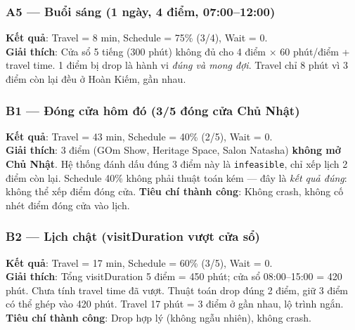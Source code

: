 \documentclass[12pt,a4paper]{article}
\begin{document}
\subsubsection*{A5 --- Buổi sáng (1 ngày, 4 điểm, 07:00--12:00)}
\begin{tcolorbox}[scenbox]
\textbf{Kết quả}: Travel = 8 min, Schedule = 75\% (3/4), Wait = 0.\\
\textbf{Giải thích}: Cửa sổ 5 tiếng (300 phút) không đủ cho 4 điểm $\times$ 60 phút/điểm +
travel time. 1 điểm bị drop là hành vi \textit{đúng và mong đợi}. Travel chỉ 8 phút vì 3 điểm còn lại
đều ở Hoàn Kiếm, gần nhau.
\end{tcolorbox}

\subsubsection*{B1 --- Đóng cửa hôm đó (3/5 đóng cửa Chủ Nhật)}
\begin{tcolorbox}[warnbox, title={B1 --- Kiểm tra xử lý đóng cửa}]
\textbf{Kết quả}: Travel = 43 min, Schedule = 40\% (2/5), Wait = 0.\\
\textbf{Giải thích}: 3 điểm (GOm Show, Heritage Space, Salon Natasha) \textbf{không mở Chủ Nhật}.
Hệ thống đánh dấu đúng 3 điểm này là \texttt{infeasible}, chỉ xếp lịch 2 điểm còn lại.
Schedule 40\% không phải thuật toán kém --- đây là \textit{kết quả đúng}: không thể xếp điểm đóng cửa.
\textbf{Tiêu chí thành công}: Không crash, không cố nhét điểm đóng cửa vào lịch. \checkmark
\end{tcolorbox}

\subsubsection*{B2 --- Lịch chật (visitDuration vượt cửa sổ)}
\begin{tcolorbox}[warnbox, title={B2 --- Kiểm tra chiến lược drop}]
\textbf{Kết quả}: Travel = 17 min, Schedule = 60\% (3/5), Wait = 0.\\
\textbf{Giải thích}: Tổng visitDuration 5 điểm = 450 phút; cửa sổ 08:00--15:00 = 420 phút.
Chưa tính travel time đã vượt. Thuật toán drop đúng 2 điểm, giữ 3 điểm có thể ghép vào 420 phút.
Travel 17 phút = 3 điểm ở gần nhau, lộ trình ngắn.
\textbf{Tiêu chí thành công}: Drop hợp lý (không ngẫu nhiên), không crash. \checkmark
\end{tcolorbox}
\end{document}
